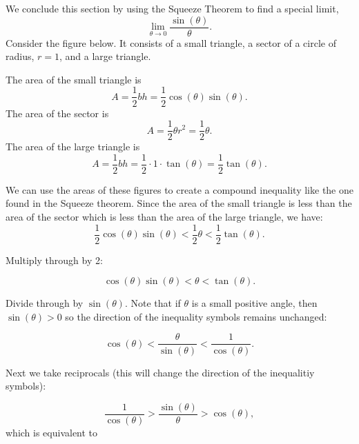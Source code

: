\documentclass{ximera}
\begin{document}
We conclude this section by using the Squeeze Theorem to find a special limit, 
\[
\lim_{\theta \to 0} \frac{\sin(\theta)}{\theta}.
\]
Consider the figure below.  It consists of a small triangle, a sector of a circle of radius,  $r = 1$, and a large triangle.

\begin{image}
\end{image}







The area of the small triangle is 
\[
A = \frac12 bh = \frac12 \cos(\theta) \sin(\theta).
\]
The area of the sector is 
\[
A = \frac12 \theta r^2 = \frac12 \theta.
\]
The area of the large triangle is 
\[
A = \frac12 bh = \frac12 \cdot 1 \cdot \tan(\theta) = \frac12 \tan(\theta).
\]

We can use the areas of these figures to create a compound inequality like the one found in the Squeeze theorem.
Since the area of the small triangle is less than the area of the sector which is less than the area of the large triangle, we have:
\[
\frac12 \cos(\theta) \sin(\theta) < \frac12 \theta < \frac12 \tan(\theta).
\]

Multiply through by 2:

\[
\cos(\theta) \sin(\theta) < \theta < \tan(\theta).
\]

Divide through by $\sin(\theta)$.  Note that if $\theta$ is a small positive angle, then $\sin(\theta) >0$ so the direction of the inequality symbols remains unchanged:

\[
\cos(\theta)  < \frac{ \theta}{\sin(\theta)} < \frac{1}{\cos(\theta)}.
\]

Next we take reciprocals (this will change the direction of the inequalitiy symbols):

\[
\frac{1}{\cos(\theta)}  > \frac{\sin(\theta)}{\theta} > \cos(\theta),
\]
which is equivalent to 
\end{document}
